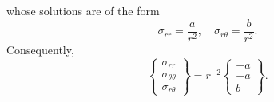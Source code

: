 whose solutions are of the form
\begin{equation}
  \sigma_{rr} = \frac{a}{r^2}, \quad \sigma_{r\theta} = \frac{b}{r^2}.
\end{equation}
Consequently,
\begin{equation}
  \left\{ \begin{array}{c} \sigma_{rr} \\ \sigma_{\theta \theta} \\ \sigma_{r \theta} \end{array} \right\} = r^{-2} \left\{ \begin{array}{c} +a \\ -a \\ b \end{array} \right\}.
\end{equation}

